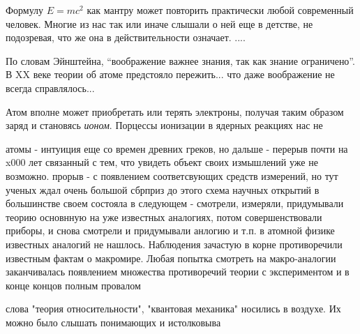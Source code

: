Формулу $E = mc^2$ как мантру может повторить практически любой современный человек.
Многие из нас так или иначе слышали о ней еще в детстве, не подозревая, что же она в действительности означает.
....






По словам Эйнштейна, ``воображение важнее знания, так как знание ограничено''.
В XX веке теории об атоме предстояло пережить... что даже воображение не всегда справлялось...


Атом вполне может приобретать или терять электроны, получая таким образом заряд и становясь \textit{ионом}.
Порцессы ионизации в ядерных реакциях нас не 



атомы - интуиция еще со времен древних греков, но дальше - перерыв почти на x000 лет связанный с тем, что увидеть объект своих измышлений уже не возможно.
прорыв - с появлением соответсвующих средств измерений, но тут ученых ждал очень большой сбрприз
до этого схема научных открытий в большинстве своем состояла в следующем - смотрели, измеряли, придумывали теорию основнную на уже известных аналогиях, потом совершенствовали приборы, и снова смотрели и придумывали анлогию и т.п.
в атомной физике известных аналогий не нашлось. Наблюдения зачастую в корне противоречили известным фактам о макромире. Любая попытка смотреть на макро-аналогии заканчивалась появлением множества противоречий теории с экспериментом и в конце концов полным провалом 




 
слова "теория относительности", "квантовая механика" носились в воздухе. Их можно было слышать  понимающих и истолковыва


